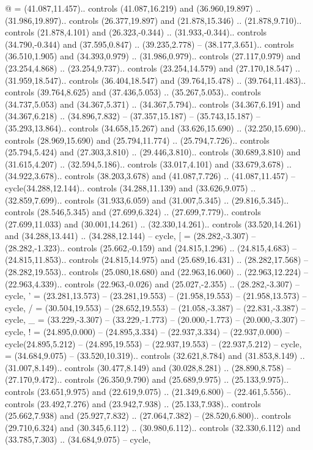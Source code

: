{@} = {(41.087,11.457).. controls (41.087,16.219) and (36.960,19.897) .. (31.986,19.897).. controls (26.377,19.897) and (21.878,15.346) .. (21.878,9.710).. controls (21.878,4.101) and (26.323,-0.344) .. (31.933,-0.344).. controls (34.790,-0.344) and (37.595,0.847) .. (39.235,2.778) -- (38.177,3.651).. controls (36.510,1.905) and (34.393,0.979) .. (31.986,0.979).. controls (27.117,0.979) and (23.254,4.868) .. (23.254,9.737).. controls (23.254,14.579) and (27.170,18.547) .. (31.959,18.547).. controls (36.404,18.547) and (39.764,15.478) .. (39.764,11.483).. controls (39.764,8.625) and (37.436,5.053) .. (35.267,5.053).. controls (34.737,5.053) and (34.367,5.371) .. (34.367,5.794).. controls (34.367,6.191) and (34.367,6.218) .. (34.896,7.832) -- (37.357,15.187) -- (35.743,15.187) -- (35.293,13.864).. controls (34.658,15.267) and (33.626,15.690) .. (32.250,15.690).. controls (28.969,15.690) and (25.794,11.774) .. (25.794,7.726).. controls (25.794,5.424) and (27.303,3.810) .. (29.446,3.810).. controls (30.689,3.810) and (31.615,4.207) .. (32.594,5.186).. controls (33.017,4.101) and (33.679,3.678) .. (34.922,3.678).. controls (38.203,3.678) and (41.087,7.726) .. (41.087,11.457) -- cycle(34.288,12.144).. controls (34.288,11.139) and (33.626,9.075) .. (32.859,7.699).. controls (31.933,6.059) and (31.007,5.345) .. (29.816,5.345).. controls (28.546,5.345) and (27.699,6.324) .. (27.699,7.779).. controls (27.699,11.033) and (30.001,14.261) .. (32.330,14.261).. controls (33.520,14.261) and (34.288,13.441) .. (34.288,12.144) -- cycle},
{[} = {(28.282,-3.307) -- (28.282,-1.323).. controls (25.662,-0.159) and (24.815,1.296) .. (24.815,4.683) -- (24.815,11.853).. controls (24.815,14.975) and (25.689,16.431) .. (28.282,17.568) -- (28.282,19.553).. controls (25.080,18.680) and (22.963,16.060) .. (22.963,12.224) -- (22.963,4.339).. controls (22.963,-0.026) and (25.027,-2.355) .. (28.282,-3.307) -- cycle},
{'} = {(23.281,13.573) -- (23.281,19.553) -- (21.958,19.553) -- (21.958,13.573) -- cycle},
{/} = {(30.504,19.553) -- (28.652,19.553) -- (21.058,-3.387) -- (22.831,-3.387) -- cycle},
{_} = {(33.229,-3.307) -- (33.229,-1.773) -- (20.000,-1.773) -- (20.000,-3.307) -- cycle},
{!} = {(24.895,0.000) -- (24.895,3.334) -- (22.937,3.334) -- (22.937,0.000) -- cycle(24.895,5.212) -- (24.895,19.553) -- (22.937,19.553) -- (22.937,5.212) -- cycle},
{~} = {(34.684,9.075) -- (33.520,10.319).. controls (32.621,8.784) and (31.853,8.149) .. (31.007,8.149).. controls (30.477,8.149) and (30.028,8.281) .. (28.890,8.758) -- (27.170,9.472).. controls (26.350,9.790) and (25.689,9.975) .. (25.133,9.975).. controls (23.651,9.975) and (22.619,9.075) .. (21.349,6.800) -- (22.461,5.556).. controls (23.492,7.276) and (23.942,7.938) .. (25.133,7.938).. controls (25.662,7.938) and (25.927,7.832) .. (27.064,7.382) -- (28.520,6.800).. controls (29.710,6.324) and (30.345,6.112) .. (30.980,6.112).. controls (32.330,6.112) and (33.785,7.303) .. (34.684,9.075) -- cycle},
